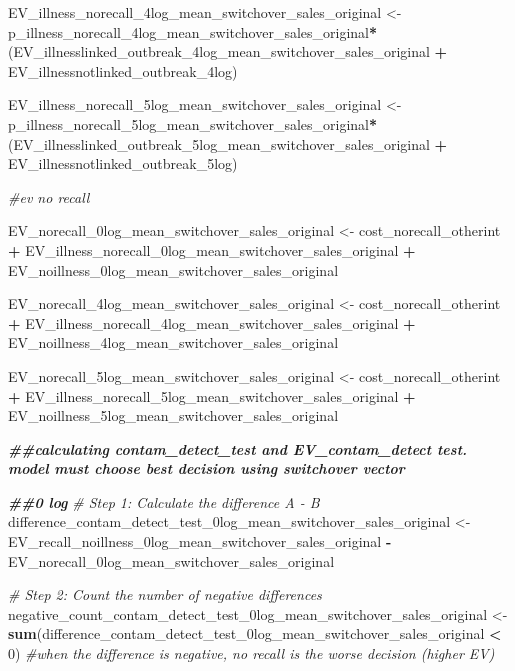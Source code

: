 \documentclass[
]{article}
\newenvironment{Shaded}{\begin{snugshade}}{\end{snugshade}}
\newcommand{\CommentTok}[1]{\textcolor[rgb]{0.56,0.35,0.01}{\textit{#1}}}
\newcommand{\DecValTok}[1]{\textcolor[rgb]{0.00,0.00,0.81}{#1}}
\newcommand{\DocumentationTok}[1]{\textcolor[rgb]{0.56,0.35,0.01}{\textbf{\textit{#1}}}}
\newcommand{\FunctionTok}[1]{\textcolor[rgb]{0.13,0.29,0.53}{\textbf{#1}}}
\newcommand{\NormalTok}[1]{#1}
\newcommand{\OtherTok}[1]{\textcolor[rgb]{0.56,0.35,0.01}{#1}}
\newcommand{\SpecialCharTok}[1]{\textcolor[rgb]{0.81,0.36,0.00}{\textbf{#1}}}
\begin{document}
\begin{Shaded}
\begin{Highlighting}[]
\NormalTok{EV\_illness\_norecall\_4log\_mean\_switchover\_sales\_original }\OtherTok{\textless{}{-}}\NormalTok{ p\_illness\_norecall\_4log\_mean\_switchover\_sales\_original}\SpecialCharTok{*}\NormalTok{(EV\_illnesslinked\_outbreak\_4log\_mean\_switchover\_sales\_original }\SpecialCharTok{+}\NormalTok{ EV\_illnessnotlinked\_outbreak\_4log)}

\NormalTok{EV\_illness\_norecall\_5log\_mean\_switchover\_sales\_original }\OtherTok{\textless{}{-}}\NormalTok{ p\_illness\_norecall\_5log\_mean\_switchover\_sales\_original}\SpecialCharTok{*}\NormalTok{(EV\_illnesslinked\_outbreak\_5log\_mean\_switchover\_sales\_original }\SpecialCharTok{+}\NormalTok{ EV\_illnessnotlinked\_outbreak\_5log)}


\CommentTok{\#ev no recall}

\NormalTok{EV\_norecall\_0log\_mean\_switchover\_sales\_original }\OtherTok{\textless{}{-}}\NormalTok{ cost\_norecall\_otherint }\SpecialCharTok{+}\NormalTok{ EV\_illness\_norecall\_0log\_mean\_switchover\_sales\_original }\SpecialCharTok{+}\NormalTok{ EV\_noillness\_0log\_mean\_switchover\_sales\_original}

\NormalTok{EV\_norecall\_4log\_mean\_switchover\_sales\_original }\OtherTok{\textless{}{-}}\NormalTok{ cost\_norecall\_otherint }\SpecialCharTok{+}\NormalTok{ EV\_illness\_norecall\_4log\_mean\_switchover\_sales\_original }\SpecialCharTok{+}\NormalTok{ EV\_noillness\_4log\_mean\_switchover\_sales\_original}

\NormalTok{EV\_norecall\_5log\_mean\_switchover\_sales\_original }\OtherTok{\textless{}{-}}\NormalTok{ cost\_norecall\_otherint }\SpecialCharTok{+}\NormalTok{ EV\_illness\_norecall\_5log\_mean\_switchover\_sales\_original }\SpecialCharTok{+}\NormalTok{ EV\_noillness\_5log\_mean\_switchover\_sales\_original}



\DocumentationTok{\#\#calculating contam\_detect\_test and EV\_contam\_detect test. model must choose best decision using switchover vector}

\DocumentationTok{\#\#0 log}
\CommentTok{\# Step 1: Calculate the difference A {-} B}
\NormalTok{difference\_contam\_detect\_test\_0log\_mean\_switchover\_sales\_original }\OtherTok{\textless{}{-}}\NormalTok{ EV\_recall\_noillness\_0log\_mean\_switchover\_sales\_original }\SpecialCharTok{{-}}\NormalTok{ EV\_norecall\_0log\_mean\_switchover\_sales\_original}

\CommentTok{\# Step 2: Count the number of negative differences}
\NormalTok{negative\_count\_contam\_detect\_test\_0log\_mean\_switchover\_sales\_original }\OtherTok{\textless{}{-}} \FunctionTok{sum}\NormalTok{(difference\_contam\_detect\_test\_0log\_mean\_switchover\_sales\_original }\SpecialCharTok{\textless{}} \DecValTok{0}\NormalTok{) }\CommentTok{\#when the difference is negative, no recall is the worse decision (higher EV)}


\end{Highlighting}
\end{Shaded}
\end{document}
